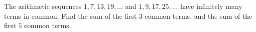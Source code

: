 The arithmetic sequences $1,7,13,19,\dots$ and $1,9,17,25,\dots$ have infinitely many terms in common. Find the sum of the first $3$ common terms, and the sum of the first $5$ common terms.
